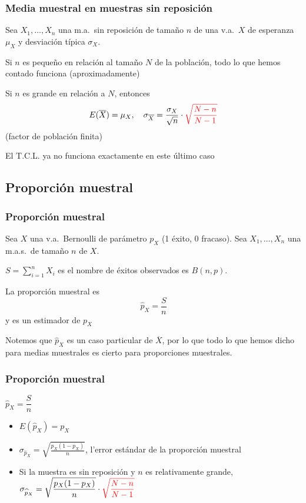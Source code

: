 \documentclass[12pt,t]{beamer}\usepackage[]{graphicx}\usepackage[]{color}
\newcommand{\red}[1]{\textcolor{red}{#1}}
\renewcommand{\emph}[1]{{\color{red}#1}}
\theoremstyle{plain}
\theoremstyle{definition}
\begin{document}
\begin{frame}
\frametitle{Media muestral en muestras sin reposición}

Sea $X_1,\ldots, X_n$ una m.a.\ \emph{sin  reposición} de tamaño $n$ de una v.a.\ $X$ de esperanza $\mu_X$ y desviación típica $\sigma_X$. 
\medskip

Si $n$ es  pequeño en relación al tamaño $N$ de la población, todo lo que hemos contado funciona (aproximadamente)
\medskip

Si $n$ es grande en relación a $N$, entonces
$$
E(\overline{X})=\mu_X,\quad \sigma_{\overline{X}}=\frac{\sigma_X}{\sqrt{n}}\cdot\red{\sqrt{\frac{N-n}{N-1}}}
$$
(\emph{factor de población finita})
\medskip

El T.C.L. ya no funciona exactamente en este último caso
\end{frame}

\subsection{Proporción  muestral}
\begin{frame}
\frametitle{Proporción  muestral}

Sea $X$ una v.a.\ Bernoulli de parámetro  $p_X$ (1 éxito, 0 fracaso). Sea $X_1,\ldots,X_n$ una m.a.s.\ de tamaño $n$ de $X$. 
\medskip

$S=\sum_{i=1}^n X_i$ es el nombre de éxitos observados
es $B(n,p)$.
\medskip

La \emph{proporción muestral} es 
$$
\widehat{p}_X=\frac{S}{n}
$$
y es un estimador de $p_X$
\medskip

Notemos que $\widehat{p}_X$ es un caso particular de $\overline{X}$, por lo que todo lo que hemos dicho para medias muestrales es cierto para proporciones muestrales.

\end{frame}


\begin{frame}
\frametitle{Proporción  muestral}
$\widehat{p}_X=\dfrac{S}{n}$
\medskip

\begin{itemize}
\item $E(\widehat{p}_X)=p_X$
\medskip


\item $\displaystyle \sigma_{\widehat{p}_X}=\sqrt{\frac{p_X(1-p_X)}{n}}$, l'\emph{error estándar} de la proporción muestral
\medskip

\item Si la muestra es sin reposición y $n$ es relativamente grande,
$\displaystyle\sigma_{\widehat{p}_X}=\sqrt{\frac{p_X(1-p_X)}{n}}\cdot\red{\sqrt{\frac{N-n}{N-1}}}$
\end{itemize}

\end{frame}
\end{document}
